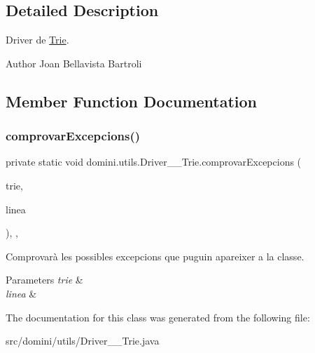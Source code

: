 \subsection{Detailed Description}
Driver de \hyperlink{classdomini_1_1utils_1_1Trie}{Trie}. 

\begin{DoxyAuthor}{Author}
Joan Bellavista Bartroli 
\end{DoxyAuthor}


\subsection{Member Function Documentation}
\mbox{\label{classdomini_1_1utils_1_1Driver____Trie_a4b7da837f4ab40b07d4b06730c8e015a}} 
\subsubsection{\texorpdfstring{comprovar\+Excepcions()}{comprovarExcepcions()}}
{\footnotesize\ttfamily private static void domini.\+utils.\+Driver\+\_\+\+\_\+\+Trie.\+comprovar\+Excepcions (\begin{DoxyParamCaption}\item[{\hyperlink{classdomini_1_1utils_1_1Trie}{Trie}}]{trie,  }\item[{String}]{linea }\end{DoxyParamCaption})\hspace{0.3cm}{\ttfamily [inline]}, {\ttfamily [static]}, {\ttfamily [private]}}



Comprovarà les possibles excepcions que puguin apareixer a la classe. 


\begin{DoxyParams}{Parameters}
{\em trie} & \\
\hline
{\em linea} & \\
\hline
\end{DoxyParams}


The documentation for this class was generated from the following file\+:\begin{DoxyCompactItemize}
\item 
src/domini/utils/Driver\+\_\+\+\_\+\+Trie.\+java\end{DoxyCompactItemize}
